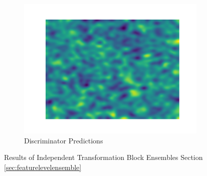 \begin{figure}[htbp]
\begin{subfigure}[b]{0.3\textwidth}
    \end{subfigure}
    \begin{subfigure}[b]{0.3\textwidth}
        \centering
        \includegraphics[width=\textwidth]{figures/pca_results/pca_res.png}
        \caption*{Discriminator Predictions}

    \end{subfigure}
    \caption{Results of Independent Transformation Block Ensembles Section \ref{sec:featurelevelensemble}}
    \label{fig:pca_res}
\end{figure}
